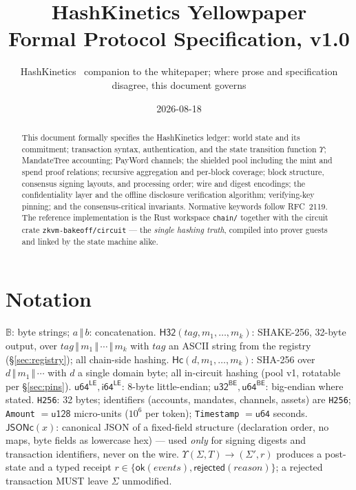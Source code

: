 \documentclass[10pt]{article}
\title{\vspace{-1.0cm}\textbf{HashKinetics Yellowpaper}\\[0.25em]\large Formal Protocol Specification, v1.0}
\author{HashKinetics \textperiodcentered\ \normalsize companion to the whitepaper; where prose and specification disagree, this document governs}
\date{2026-08-18}
\newcommand{\ct}[1]{\texttt{#1}}
\newcommand{\Hs}{\mathsf{H32}}
\newcommand{\Hc}{\mathsf{Hc}}
\newcommand{\cat}{\,\Vert\,}
\newcommand{\stx}{\ensuremath{\Sigma}}
\begin{document}
\maketitle
\vspace{-0.9cm}

\begin{abstract}
\noindent This document formally specifies the HashKinetics ledger: world state and its commitment; transaction syntax, authentication, and the state transition function $\Upsilon$; MandateTree accounting; PayWord channels; the shielded pool including the mint and spend proof relations; recursive aggregation and per-block coverage; block structure, consensus signing layouts, and processing order; wire and digest encodings; the confidentiality layer and the offline disclosure verification algorithm; verifying-key pinning; and the consensus-critical invariants. Normative keywords follow RFC~2119. The reference implementation is the Rust workspace \ct{chain/} together with the circuit crate \ct{zkvm-bakeoff/circuit} --- the \emph{single hashing truth}, compiled into prover guests and linked by the state machine alike.
\end{abstract}

\section{Notation}
$\mathbb{B}$: byte strings; $a \cat b$: concatenation. $\Hs(\mathit{tag}, m_1,\ldots,m_k)$: SHAKE-256, 32-byte output, over $\mathit{tag}\cat m_1\cat\cdots\cat m_k$ with $\mathit{tag}$ an ASCII string from the registry (\S\ref{sec:registry}); all chain-side hashing. $\Hc(d, m_1,\ldots,m_k)$: SHA-256 over $d\cat m_1\cat\cdots$ with $d$ a single domain byte; all in-circuit hashing (pool v1, rotatable per \S\ref{sec:pins}). $\mathsf{u64^{LE}}, \mathsf{i64^{LE}}$: 8-byte little-endian; $\mathsf{u32^{BE}}, \mathsf{u64^{BE}}$: big-endian where stated. \ct{H256}: 32 bytes; identifiers (accounts, mandates, channels, assets) are \ct{H256}; \ct{Amount} $= \mathsf{u128}$ micro-units ($10^6$ per token); \ct{Timestamp} $= \mathsf{u64}$ seconds. $\mathsf{JSONc}(x)$: canonical JSON of a fixed-field structure (declaration order, no maps, byte fields as lowercase hex) --- used \emph{only} for signing digests and transaction identifiers, never on the wire. $\Upsilon(\stx, T) \rightarrow (\stx', r)$ produces a post-state and a typed receipt $r \in \{\mathsf{ok}(\mathit{events}), \mathsf{rejected}(\mathit{reason})\}$; a rejected transaction MUST leave \stx{} unmodified.
\end{document}
